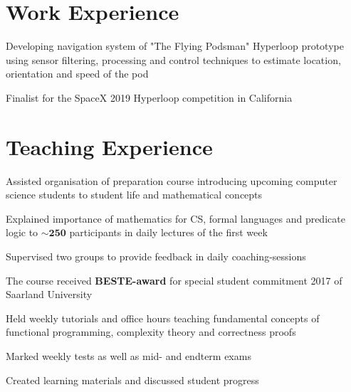 \documentclass[]{deedy-resume}
\begin{document}
\begin{minipage}[t]{0.66\textwidth}

\section{Work Experience}
\begin{tightemize}
    \item Developing navigation system of "The Flying Podsman" Hyperloop prototype using sensor filtering, processing and control techniques to estimate location, orientation and speed of the pod
    \item Finalist for the SpaceX 2019 Hyperloop competition in California
\end{tightemize}
\sectionsep



\section{Teaching Experience}
\begin{tightemize}
    \item Assisted organisation of preparation course introducing upcoming computer science students to student life and mathematical concepts %
    \item Explained importance of mathematics for CS, formal languages and predicate logic to $\mathbf{\sim 250}$ participants in daily lectures of the first week
    \item Supervised two groups to provide feedback in daily coaching-sessions
    \item The course received \textbf{BESTE-award} for special student commitment 2017 of Saarland University
\end{tightemize}
\sectionsep

\begin{tightemize}
    \item Held weekly tutorials and office hours teaching fundamental concepts of functional programming, complexity theory and correctness proofs
    \item Marked weekly tests as well as mid- and endterm exams
    \item Created learning materials and discussed student progress
\end{tightemize}
\sectionsep



\end{minipage}
\end{document}
